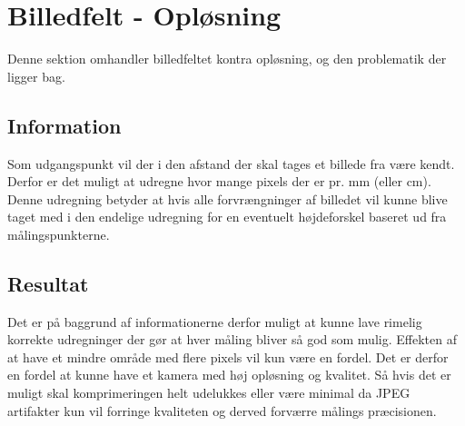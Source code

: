 \section{Billedfelt - Opløsning}

Denne sektion omhandler billedfeltet kontra opløsning, og den problematik der ligger bag.

\subsection{Information}

Som udgangspunkt vil der i den afstand der skal tages et billede fra være kendt. Derfor er det muligt at udregne hvor mange pixels der er pr. mm (eller cm). Denne udregning betyder at hvis alle forvrængninger af billedet vil kunne blive taget med i den endelige udregning for en eventuelt højdeforskel baseret ud fra målingspunkterne.

\subsection{Resultat}

Det er på baggrund af informationerne derfor muligt at kunne lave rimelig korrekte udregninger der gør at hver måling bliver så god som mulig. Effekten af at have et mindre område med flere pixels vil kun være en fordel. Det er derfor en fordel at kunne have et kamera med høj opløsning og kvalitet. Så hvis det er muligt skal komprimeringen helt udelukkes eller være minimal da JPEG artifakter kun vil forringe kvaliteten og derved forværre målings præcisionen.
